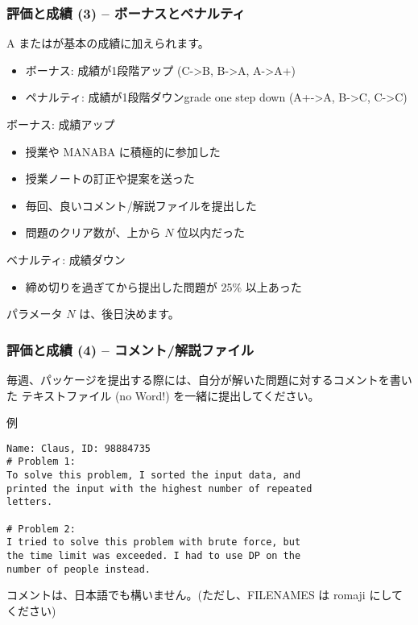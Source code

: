 \documentclass{beamer}
\begin{document}
\begin{frame}
  \frametitle{評価と成績 (3) -- ボーナスとペナルティ}
  
  {\small
  A またはが基本の成績に加えられます。
  \begin{itemize}
    \item ボーナス: 成績が1段階アップ (C->B, B->A, A->A+)
    \item ペナルティ: 成績が1段階ダウンgrade one step down (A+->A, B->C, \alert{C->C})
  \end{itemize}
  }

  \medskip
  \begin{exampleblock}{ボーナス: 成績アップ}
    \begin{itemize}
    \item 授業や MANABA に積極的に参加した
    \item 授業ノートの訂正や提案を送った
    \item 毎回、良いコメント/解説ファイルを提出した
    \item 問題のクリア数が、上から $N$ 位以内だった
    \end{itemize}
  \end{exampleblock}
  \begin{alertblock}{ベナルティ: 成績ダウン}
    \begin{itemize}
    \item 締め切りを過ぎてから提出した問題が 25\% 以上あった
    \end{itemize}
  \end{alertblock}

  \tiny{パラメータ $N$ は、後日決めます。}
\end{frame}

\begin{frame}[fragile]
  \frametitle{評価と成績 (4) -- コメント/解説ファイル}

  毎週、パッケージを提出する際には、自分が解いた問題に対するコメントを書いた
  テキストファイル (no Word!) を一緒に提出してください。
    
  \begin{exampleblock}{例}
    {\smaller
\begin{verbatim}
Name: Claus, ID: 98884735
# Problem 1:
To solve this problem, I sorted the input data, and 
printed the input with the highest number of repeated 
letters.

# Problem 2: 
I tried to solve this problem with brute force, but 
the time limit was exceeded. I had to use DP on the 
number of people instead.
\end{verbatim}}
  \end{exampleblock}

  \bigskip
  
  コメントは、日本語でも構いません。{\small (ただし、FILENAMES は romaji にしてください)}
\end{frame}
\end{document}
